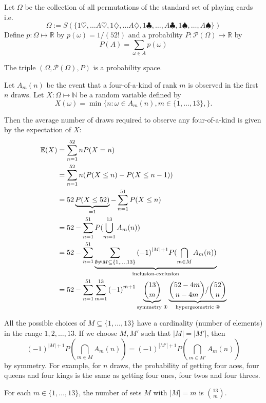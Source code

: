 \documentclass[6pt]{article}
\begin{document}
\begin{tcolorbox}[title=\text{The Standard Probability Space for Playing Cards}]
Let $\Omega$ be the collection of all permutations of the standard set of playing cards i.e.
  \[
      \Omega := S(\{1\heartsuit, \ldots A\heartsuit,1\diamondsuit,\ldots A\diamondsuit, 1\clubsuit,\ldots,A\clubsuit,1\spadesuit,\ldots,A\spadesuit\})
  \]
Define $p: \Omega \mapsto \mathbb{R}$ by $p(\omega) = 1/(52!)$
and a probability $P: \mathcal{P}(\Omega) \mapsto \mathbb{R}$  by
\[
    P(A) = \sum_{\omega \in A}p(\omega)
\]

The triple $(\Omega, \mathcal{P}(\Omega), P )$ is a probability space.
\end{tcolorbox}

\clearpage

\begin{tcolorbox}
Let $A_m(n)$ be the event that a four-of-a-kind of rank $m$ is observed in the first $n$ draws. Let
$X: \Omega \mapsto \mathbb{N}$ be a random variable defined by
\[
X(\omega) = \min \{ n : \omega \in A_m(n), m \in \{1, \ldots, 13\},\}.
\]

Then the average number of draws required to observe any four-of-a-kind is given by the expectation of $X$:
\begin{align*}
\mathbb{E}(X) &= \sum_{n = 1}^{52} n P(X  = n)\\
&= \sum_{n=1}^{52} n (P(X \leq n) - P(X \leq n -1)) \\
&= 52\underbrace{P(X \leq 52)}_{= 1} - \sum_{n=1}^{51} P(X\leq n) \\
&= 52 - \sum_{n=1}^{51} P(\bigcup_{m=1}^{13} A_m(n)) \\
& = 52 - \sum_{n=1}^{51} \underbrace{\sum_{\emptyset \neq M \subseteq \{1,\ldots,13\}} {(-1)}^{|M| + 1} P(\bigcap_{m \in M} A_m(n))}_{\text{inclusion-exclusion}} \\
& = 52 - \sum_{n = 1}^{51}\sum_{m = 1}^{13}  {(-1)}^{m+1}\underbrace{{13 \choose m}}_{\text{symmetry \ding{172}}} \underbrace{{52 -4m \choose n - 4m}/{52 \choose n}}_{\text{hypergeometric \ding{173}}} \\
\end{align*}
\end{tcolorbox}
\clearpage

\begin{tcolorbox}[title=\text{Symmetry \ding{172}}]
All the possible choices of $M \subseteq \{1, \ldots, 13\}$ have a cardinality (number of elements) in the range $1, 2, \ldots, 13$. If we choose $M, M'$ such that $|M| = |M'|$, then
\[
{(-1)}^{|M| + 1} P(\bigcap_{m \in M} A_m(n)) =  {(-1)}^{|M'| + 1} P(\bigcap_{m \in M'} A_m(n))
 \]
by symmetry. For example, for $n$ draws, the probability of getting four aces, four queens and four kings is the same as getting four ones, four twos and four threes.

For each $m \in \{1, \ldots, 13\}$, the number of sets $M$ with $|M|=m$ is ${13 \choose m}$.
\end{tcolorbox}
\end{document}
